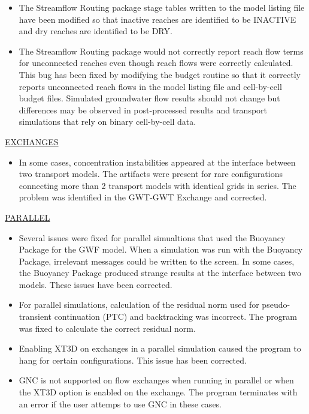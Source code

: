 \begin{itemize}
		\item The Streamflow Routing package stage tables written to the model listing file have been modified so that inactive reaches are identified to be INACTIVE and dry reaches are identified to be DRY.
		\item The Streamflow Routing package would not correctly report reach flow terms for unconnected reaches even though reach flows were correctly calculated. This bug has been fixed by modifying the budget routine so that it correctly reports unconnected reach flows in the model listing file and cell-by-cell budget files. Simulated groundwater flow results should not change but differences may be observed in post-processed results and transport simulations that rely on binary cell-by-cell data.
	\end{itemize}


	\underline{EXCHANGES}
	\begin{itemize}
		\item In some cases, concentration instabilities appeared at the interface between two transport models. The artifacts were present for rare configurations connecting more than 2 transport models with identical grids in series.  The problem was identified in the GWT-GWT Exchange and corrected.
	\end{itemize}

	\underline{PARALLEL}
	\begin{itemize}
		\item Several issues were fixed for parallel simualtions that used the Buoyancy Package for the GWF model.  When a simulation was run with the Buoyancy Package, irrelevant messages could be written to the screen.  In some cases, the Buoyancy Package produced  strange results at the interface between two models.  These issues have been corrected.
		\item For parallel simulations, calculation of the residual norm used for pseudo-transient continuation (PTC) and backtracking was incorrect.  The program was fixed to calculate the correct residual norm.
		\item Enabling XT3D on exchanges in a parallel simulation caused the program to hang for certain configurations. This issue has been corrected.
		\item GNC is not supported on flow exchanges when running in parallel or when the XT3D option is enabled on the exchange. The program terminates with an error if the user attemps to use GNC in these cases.
	\end{itemize}
